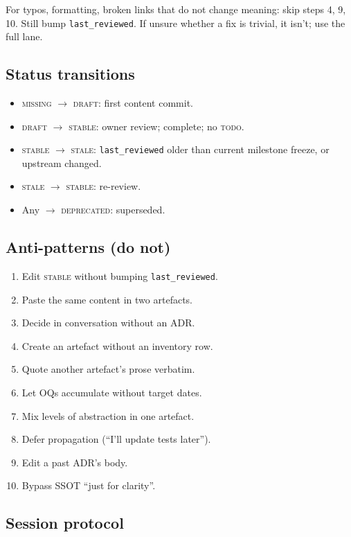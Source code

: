 \documentclass[11pt,a4paper,twocolumn]{article}
\begin{document}
For typos, formatting, broken links that do not change meaning:
skip steps 4, 9, 10. Still bump \texttt{last\_reviewed}. If unsure
whether a fix is trivial, it isn't; use the full lane.

\subsection*{Status transitions}

\begin{itemize}[nosep,leftmargin=1.2em]
\item \textsc{missing} $\to$ \textsc{draft}: first content commit.
\item \textsc{draft} $\to$ \textsc{stable}: owner review; complete; no \textsc{todo}.
\item \textsc{stable} $\to$ \textsc{stale}: \texttt{last\_reviewed} older than current milestone freeze, or upstream changed.
\item \textsc{stale} $\to$ \textsc{stable}: re-review.
\item Any $\to$ \textsc{deprecated}: superseded.
\end{itemize}

\subsection*{Anti-patterns (do not)}

\begin{enumerate}[nosep,leftmargin=1.2em]
\item Edit \textsc{stable} without bumping \texttt{last\_reviewed}.
\item Paste the same content in two artefacts.
\item Decide in conversation without an ADR.
\item Create an artefact without an inventory row.
\item Quote another artefact's prose verbatim.
\item Let OQs accumulate without target dates.
\item Mix levels of abstraction in one artefact.
\item Defer propagation (``I'll update tests later'').
\item Edit a past ADR's body.
\item Bypass SSOT ``just for clarity''.
\end{enumerate}

\subsection*{Session protocol}
\end{document}
